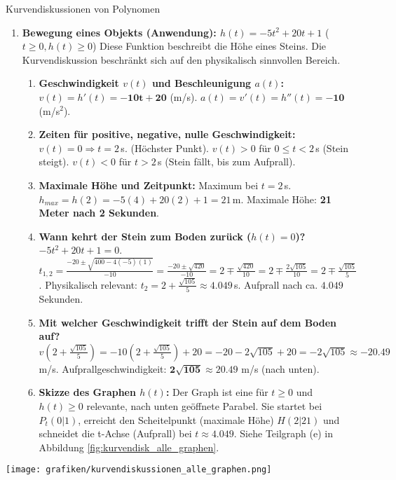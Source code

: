 \begin{loesungsumgebung}{Kurvendiskussionen von Polynomen}
\begin{enumerate}[label=(\alph*)]
    \item \textbf{Bewegung eines Objekts (Anwendung): $h(t) = -5t^2 + 20t + 1$} ($t \ge 0, h(t) \ge 0$)
    Diese Funktion beschreibt die Höhe eines Steins. Die Kurvendiskussion beschränkt sich auf den physikalisch sinnvollen Bereich.
    \begin{enumerate}[label=(\roman*)]
        \item \textbf{Geschwindigkeit $v(t)$ und Beschleunigung $a(t)$:}
        $v(t) = h'(t) = \mathbf{-10t + 20}$ (m/s).
        $a(t) = v'(t) = h''(t) = \mathbf{-10}$ (m/s$^2$).
        \item \textbf{Zeiten für positive, negative, nulle Geschwindigkeit:}
        $v(t)=0 \Rightarrow t=2\,$s. (Höchster Punkt).
        $v(t)>0$ für $0 \le t < 2\,$s (Stein steigt).
        $v(t)<0$ für $t > 2\,$s (Stein fällt, bis zum Aufprall).
        \item \textbf{Maximale Höhe und Zeitpunkt:}
        Maximum bei $t=2\,$s. $h_{max} = h(2) = -5(4) + 20(2) + 1 = 21\,$m.
        Maximale Höhe: \textbf{21 Meter nach 2 Sekunden}.
        \item \textbf{Wann kehrt der Stein zum Boden zurück ($h(t)=0$)?}
        $-5t^2 + 20t + 1 = 0$. $t_{1,2} = \frac{-20 \pm \sqrt{400-4(-5)(1)}}{-10} = \frac{-20 \pm \sqrt{420}}{-10} = 2 \mp \frac{\sqrt{420}}{10} = 2 \mp \frac{2\sqrt{105}}{10} = 2 \mp \frac{\sqrt{105}}{5}$.
        Physikalisch relevant: $t_2 = 2 + \frac{\sqrt{105}}{5} \approx 4.049\,$s.
        Aufprall nach ca. $\mathbf{4.049}$ Sekunden.
        \item \textbf{Mit welcher Geschwindigkeit trifft der Stein auf dem Boden auf?}
        $v(2 + \frac{\sqrt{105}}{5}) = -10(2 + \frac{\sqrt{105}}{5}) + 20 = -20 - 2\sqrt{105} + 20 = -2\sqrt{105} \approx -20.49\,$m/s.
        Aufprallgeschwindigkeit: $\mathbf{2\sqrt{105} \approx 20.49}$ m/s (nach unten).
        \item \textbf{Skizze des Graphen $h(t)$:} Der Graph ist eine für $t \ge 0$ und $h(t) \ge 0$ relevante, nach unten geöffnete Parabel. Sie startet bei $P_t(0|1)$, erreicht den Scheitelpunkt (maximale Höhe) $H(2|21)$ und schneidet die t-Achse (Aufprall) bei $t \approx 4.049$. Siehe Teilgraph (e) in Abbildung \ref{fig:kurvendisk_alle_graphen}.
    \end{enumerate}
\end{enumerate}

\begin{center}
    \texttt{[image: grafiken/kurvendiskussionen\_alle\_graphen.png]}
    \label{fig:kurvendisk_alle_graphen}
\end{center}
\end{loesungsumgebung}



